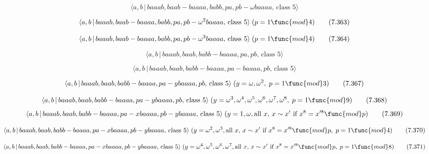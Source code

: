 \documentclass[10pt]{article}
\begin{document}
\begin{equation}
\langle a,b\,|\,baaab,baab-baaaa,babb,pa,pb-\omega baaaa,\,\text{class }%
5\rangle  \tag{7.362}
\end{equation}

\begin{equation}
\langle a,b\,|\,baaab,baab-baaaa,babb,pa,pb-\omega ^{2}baaaa,\,\text{class }%
5\rangle \;(p=1\func{mod}4)  \tag{7.363}
\end{equation}

\begin{equation}
\langle a,b\,|\,baaab,baab-baaaa,babb,pa,pb-\omega ^{3}baaaa,\,\text{class }%
5\rangle \;(p=1\func{mod}4)  \tag{7.364}
\end{equation}

\begin{equation}
\langle a,b\,|\,baaab,baab,babb-baaaa,pa,pb,\,\text{class }5\rangle 
\tag{7.365}
\end{equation}

\begin{equation}
\langle a,b\,|\,baaab,baab,babb-baaaa,pa-baaaa,pb,\,\text{class }5\rangle 
\tag{7.366}
\end{equation}

\begin{equation}
\langle a,b\,|\,baaab,baab,babb-baaaa,pa-ybaaaa,pb,\,\text{class }5\rangle
\;(y=\omega ,\omega ^{2},\;p=1\func{mod}3)  \tag{7.367}
\end{equation}

\begin{equation}
\langle a,b\,|\,baaab,baab,babb-baaaa,pa-ybaaaa,pb,\,\text{class }5\rangle
\;(y=\omega ^{3},\omega ^{4},\omega ^{5},\omega ^{6},\omega ^{7},\omega
^{8},\;p=1\func{mod}9)  \tag{7.368}
\end{equation}
\begin{equation}
\langle a,b\,|\,baaab,baab,babb-baaaa,pa-xbaaaa,pb-ybaaaa,\,\text{class }%
5\rangle \;(y=1,\omega ,\text{all }x,\,x \sim x^{\prime }\text{ if }%
x^8=x^{\prime 8}\func{mod}p)  \tag{7.369}
\end{equation}

\begin{equation}
\langle a,b\,|\,baaab,baab,babb-baaaa,pa-xbaaaa,pb-ybaaaa,\,\text{class }%
5\rangle \;(y=\omega ^{2},\omega ^{3},\text{all }x,\,x\sim x^{\prime}\text{
if }x^8=x^{\prime 8}\func{mod}p,\;p=1\func{mod}4)  \tag{7.370}
\end{equation}

\begin{equation}
\langle a,b\,|\,baaab,baab,babb-baaaa,pa-xbaaaa,pb-ybaaaa,\,\text{class }%
5\rangle \;(y=\omega ^{4},\omega ^{5},\omega ^{6},\omega ^{7},\text{all }%
x,\,x \sim x^{\prime }\text{ if }x^8=x^{\prime 8}\func{mod}p,\;p=1\func{mod}%
8)  \tag{7.371}
\end{equation}
\end{document}
